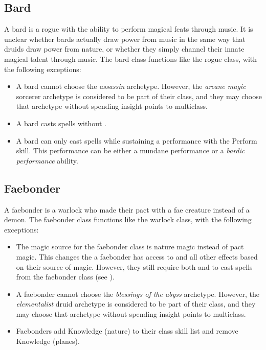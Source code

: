     \subsection{Bard}
        A bard is a rogue with the ability to perform magical feats through music.
        It is unclear whether bards actually draw power from music in the same way that druids draw power from nature, or whether they simply channel their innate magical talent through music.
        The bard class functions like the rogue class, with the following exceptions:
        \begin{itemize}
            \item A bard cannot choose the \textit{assassin} archetype. However, the \textit{arcane magic} sorcerer archetype is considered to be part of their class, and they may choose that archetype without spending insight points to multiclass.
            \item A bard casts spells without .
            \item A bard can only cast spells while sustaining a performance with the Perform skill. This performance can be either a mundane performance or a \textit{bardic performance} ability.
        \end{itemize}

    \subsection{Faebonder}
        A faebonder is a warlock who made their pact with a fae creature instead of a demon.
        The faebonder class functions like the warlock class, with the following exceptions:
        \begin{itemize}
            \item The magic source for the faebonder class is nature magic instead of pact magic.
                This changes the  a faebonder has access to and all other effects based on their source of magic.
                However, they still require both  and  to cast spells from the faebonder class (see ).
            \item A faebonder cannot choose the \textit{blessings of the abyss} archetype. However, the \textit{elementalist} druid archetype is considered to be part of their class, and they may choose that archetype without spending insight points to multiclass.
            \item Faebonders add Knowledge (nature) to their class skill list and remove Knowledge (planes).
        \end{itemize}

